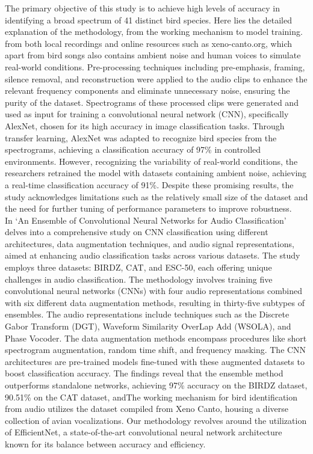 The primary objective of this study is to achieve high levels of accuracy in
identifying a broad spectrum of 41 distinct bird species. Here lies the
detailed explanation of the methodology, from the working mechanism to model
training. from both local recordings and online resources such as
xeno-canto.org, which apart from bird songs also contains ambient noise and
human voices to simulate real-world conditions. Pre-processing techniques
including pre-emphasis, framing, silence removal, and reconstruction were
applied to the audio clips to enhance the relevant frequency components and
eliminate unnecessary noise, ensuring the purity of the dataset. Spectrograms
of these processed clips were generated and used as input for training a
convolutional neural network (CNN), specifically AlexNet, chosen for its high
accuracy in image classification tasks. Through transfer learning, AlexNet was
adapted to recognize bird species from the spectrograms, achieving a
classification accuracy of 97\% in controlled environments. However,
recognizing the variability of real-world conditions, the researchers retrained
the model with datasets containing ambient noise, achieving a real-time
classification accuracy of 91\%. Despite these promising results, the study
acknowledges limitations such as the relatively small size of the dataset and
the need for further tuning of performance parameters to improve robustness.\\

In\cite{nanni2021ensemble} `An Ensemble of Convolutional Neural Networks for
Audio Classification' delves into a comprehensive study on CNN classification
using different architectures, data augmentation techniques, and audio signal
representations, aimed at enhancing audio classification tasks across various
datasets. The study employs three datasets: BIRDZ, CAT, and ESC-50, each
offering unique challenges in audio classification. The methodology involves
training five convolutional neural networks (CNNs) with four audio
representations combined with six different data augmentation methods,
resulting in thirty-five subtypes of ensembles. The audio representations
include techniques such as the Discrete Gabor Transform (DGT), Waveform
Similarity OverLap Add (WSOLA), and Phase Vocoder. The data augmentation
methods encompass procedures like short spectrogram augmentation, random time
shift, and frequency masking. The CNN architectures are pre-trained models
fine-tuned with these augmented datasets to boost classification accuracy. The
findings reveal that the ensemble method outperforms standalone networks,
achieving 97\% accuracy on the BIRDZ dataset, 90.51\% on the CAT dataset,
andThe working mechanism for bird identification from audio utilizes the
dataset compiled from Xeno Canto, housing a diverse collection of avian
vocalizations. Our methodology revolves around the utilization of EfficientNet,
a state-of-the-art convolutional neural network architecture known for its
balance between accuracy and efficiency.

